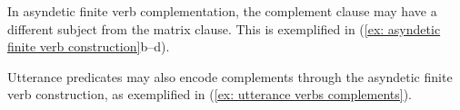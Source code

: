    \z
\z

In asyndetic finite verb complementation, the complement clause may have a different subject from the matrix clause. This is exemplified in (\ref{ex: asyndetic finite verb construction}b--d).

Utterance predicates may also encode complements through the asyndetic finite verb construction, as exemplified in (\ref{ex: utterance verbs complements}).

\ea\label{ex: utterance verbs complements}

